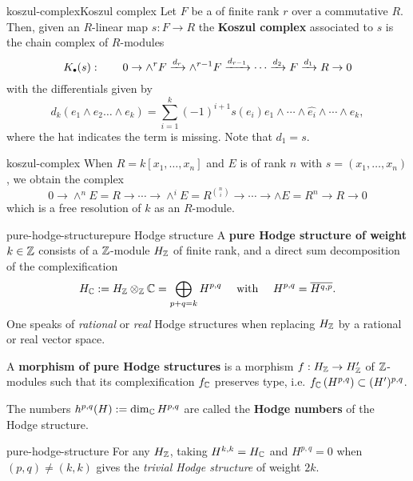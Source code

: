 \begin{topic}{koszul-complex}{Koszul complex}
    Let $F$ be a  of finite rank $r$ over a commutative  $R$. Then, given an $R$-linear map $s : F \to R$ the \textbf{Koszul complex} associated to $s$ is the chain complex of $R$-modules
    \[ K_\bdot(s) : \qquad 0 \to \wedge^r F \xrightarrow{d_r} \wedge^{r - 1} F \xrightarrow{d_{r - 1}} \cdots \xrightarrow{d_2} F \xrightarrow{d_1} R \to 0 \]
    with the differentials given by
    \[ d_k(e_1 \wedge e_2 \ldots \wedge e_k) = \sum_{i = 1}^{k} (-1)^{i + 1} s(e_i) e_1 \wedge \cdots \wedge \hat{e_i} \wedge \cdots \wedge e_k , \]
    where the hat indicates the term is missing. Note that $d_1 = s$.
\end{topic}

\begin{example}{koszul-complex}
    When $R = k[x_1, \ldots, x_n]$ and $E$ is of rank $n$ with $s = (x_1, \ldots, x_n)$, we obtain the complex 
    \[ 0 \to \wedge^n E = R \to \cdots \to \wedge^i E = R^{\binom{n}{i}} \to \cdots \to \wedge E = R^n \to R \to 0 \]
    which is a free resolution of $k$ as an $R$-module.
\end{example}

\begin{topic}{pure-hodge-structure}{pure Hodge structure}
    A \textbf{pure Hodge structure of weight $k \in \mathbb{Z}$} consists of a $\mathbb{Z}$-module $H_{\mathbb{Z}}$ of finite rank, and a direct sum decomposition of the complexification
    \[ H_{\mathbb{C}} := H_{\mathbb{Z}} \otimes_{\mathbb{Z}} \mathbb{C} = \bigoplus_{p + q = k} H^{p, q} \quad \text{ with } \quad H^{p, q} = \overline{H^{q, p}} . \]
    One speaks of \textit{rational} or \textit{real} Hodge structures when replacing $H_{\mathbb{Z}}$ by a rational or real vector space.
    
    A \textbf{morphism of pure Hodge structures} is a morphism $f : H_{\mathbb{Z}} \to H'_{\mathbb{Z}}$ of $\mathbb{Z}$-modules such that its complexification $f_{\mathbb{C}}$ preserves type, i.e. $f_{\mathbb{C}}\left(H^{p, q}\right) \subset (H')^{p, q}$.
    
    The numbers $h^{p, q}(H) := \dim_{\mathbb{C}} H^{p, q}$ are called the \textbf{Hodge numbers} of the Hodge structure.
\end{topic}

\begin{example}{pure-hodge-structure}
    For any $H_{\mathbb{Z}}$, taking $H^{k,k} = H_{\mathbb{C}}$ and $H^{p, q} = 0$ when $(p, q) \ne (k, k)$ gives the \textit{trivial Hodge structure} of weight $2k$.
\end{example}

